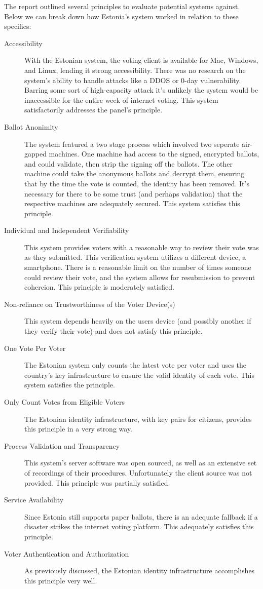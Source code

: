 \documentclass[a4paper, 11pt]{article} %
\begin{document}
The report \cite{internet-voting-report} outlined several principles to evaluate potential systems against. Below we can break down how Estonia's system worked in relation to these specifics:

\begin{description}
    \item[Accessibility] With the Estonian system, the voting client is available for Mac, Windows, and Linux, lending it strong accessibility. There was no research on the system's ability to handle attacks like a DDOS or 0-day vulnerability. Barring some sort of high-capacity attack it's unlikely the system would be inaccessible for the entire week of internet voting. This system satisfactorily addresses the panel's principle.
    \item[Ballot Anonimity] The system featured a two stage process which involved two seperate air-gapped machines. One machine had access to the signed, encrypted ballots, and could validate, then strip the signing off the ballots. The other machine could take the anonymous ballots and decrypt them, ensuring that by the time the vote is counted, the identity has been removed. It's necessary for there to be some trust (and perhaps validation) that the respective machines are adequately secured. This system satisfies this principle.
    \item[Individual and Independent Verifiability] This system provides voters with a reasonable way to review their vote was as they submitted. This verification system utilizes a different device, a smartphone. There is a reasonable limit on the number of times someone could review their vote, and the system allows for resubmission to prevent cohercion. This principle is moderately satisfied.
    \item[Non-reliance on Trustworthiness of the Voter Device(s)] This system depends heavily on the users device (and possibly another if they verify their vote) and does not satisfy this principle.
    \item[One Vote Per Voter] The Estonian system only counts the latest vote per voter and uses the country's key infrastructure to ensure the valid identity of each vote. This system satisfies the principle.
    \item[Only Count Votes from Eligible Voters] The Estonian identity infrastructure, with key pairs for citizens, provides this principle in a very strong way.
    \item[Process Validation and Transparency] This system's server software was open sourced, as well as an extensive set of recordings of their procedures. Unfortunately the client source was not provided. This principle was partially satisfied.
    \item[Service Availability] Since Estonia still supports paper ballots, there is an adequate fallback if a disaster strikes the internet voting platform. This adequately satisfies this principle.
    \item[Voter Authentication and Authorization] As previously discussed, the Estonian identity infrastructure accomplishes this principle very well.
\end{description}
\end{document}
